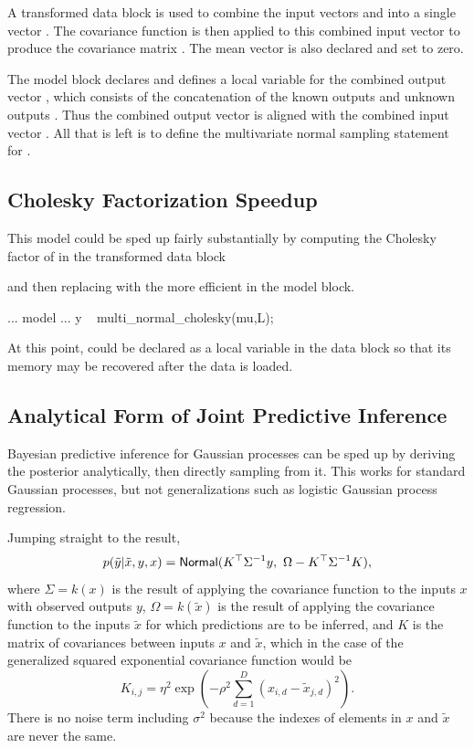 A transformed data block is used to combine the input vectors
 and  into a single vector .  The covariance
function is then applied to this combined input vector to produce the
covariance matrix .  The mean vector  is also
declared and set to zero.

The model block declares and defines a local variable for the combined
output vector , which consists of the concatenation of the
known outputs  and unknown outputs .  Thus the
combined output vector  is aligned with the combined
input vector .  All that is left is to define the multivariate
normal sampling statement for .

\subsection{Cholesky Factorization Speedup}

This model could be sped up fairly substantially by computing the
Cholesky factor of  in the transformed data block
\begin{stancode}
transformed data {
  matrix[N1+N2,N1+N2] L;
...
  L <- cholesky_decompose(Sigma);
...
\end{stancode}
%
and then replacing  with the more efficient
 in the model block.  
%
\begin{stancode}
...
model {
...
  y ~ multi_normal_cholesky(mu,L);
}
\end{stancode}
%  
At this point,  could be declared as a local
variable in the data block so that its memory may be recovered after
the data is loaded.

\subsection{Analytical Form of Joint Predictive Inference}

Bayesian predictive inference for Gaussian processes can be sped up by
deriving the posterior analytically, then directly sampling from it.
This works for standard Gaussian processes, but not
generalizations such as logistic Gaussian process regression.

Jumping straight to the result,
\[
p(\tilde{y}|\tilde{x},y,x)
= 
\distro{Normal}(K^{\top}\Sigma^{-1}y,\
                \Omega - K^{\top}\Sigma^{-1}K),
\]
where $\Sigma = k(x)$ is the result of applying the covariance
function to the inputs $x$ with observed outputs $y$, $\Omega =
k(\tilde{x})$ is the result of applying the covariance function to the
inputs $\tilde{x}$ for which predictions are to be inferred, and $K$
is the matrix of covariances between inputs $x$ and $\tilde{x}$, which
in the case of the generalized squared exponential covariance function
would be
\[
K_{i,j} = \eta^2 \exp(-\rho^2 \sum_{d=1}^D (x_{i,d} -
\tilde{x}_{j,d})^2).
\]
There is no noise term including $\sigma^2$ because the indexes of
elements in $x$ and $\tilde{x}$ are never the same.

